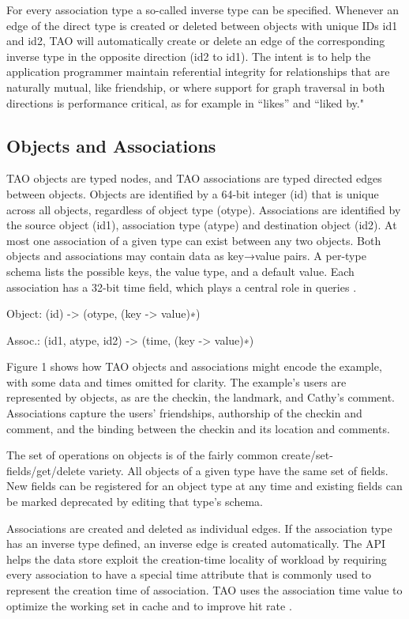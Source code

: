 \documentclass[9pt,twocolumn,twoside]{../../styles/osajnl}
\begin{document}
For every association type a so-called inverse type can be specified. Whenever an edge of the direct type is created or deleted between objects with unique IDs id1 and id2, TAO will automatically create or delete an edge of the corresponding inverse type in the opposite direction (id2 to id1). The intent is to help the application programmer maintain referential integrity for relationships that are naturally mutual, like friendship, or where support for graph traversal in both directions is performance critical, as for example in “likes” and “liked by."

\subsection{Objects and Associations}
TAO objects are typed nodes, and TAO associations are typed directed edges between objects. Objects are identified by a 64-bit integer (id) that is unique across all objects, regardless of object type (otype). Associations are identified by the source object (id1), association type (atype) and destination object (id2). At most one association of a given type can exist between any two objects. Both objects and associations may contain data as key→value pairs. A per-type schema lists the possible keys, the value type, and a default value. Each association has a 32-bit time field, which plays a central
role in queries \cite{book-tao1}.

Object: (id) -> (otype, (key -> value)∗)

Assoc.: (id1, atype, id2) -> (time, (key -> value)∗)

Figure 1 shows how TAO objects and associations might encode the example, with some data and times omitted for clarity. The example’s users are represented by objects, as are the checkin, the landmark, and Cathy’s comment. Associations capture the users’ friendships, authorship of the checkin and comment, and the binding between the checkin and its location and comments.

The set of operations on objects is of the fairly common create/set-fields/get/delete variety. All objects of a given type have the same set of fields. New fields can be registered for an object type at any time and existing fields can be marked deprecated by editing that type’s schema. 

Associations are created and deleted as individual edges. If the association type has an inverse type defined, an inverse edge is created automatically. The API helps the data store exploit the creation-time locality of workload by requiring every association to have a special time attribute that is commonly used to represent the creation time of association. TAO uses the association time value to optimize the working set in cache and to improve hit rate \cite{book-tao1}.
\end{document}
